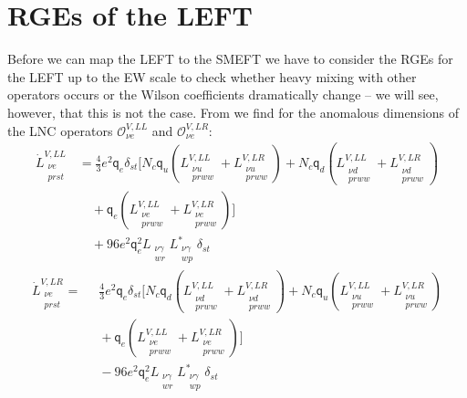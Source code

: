 \section{RGEs of the LEFT}\label{sec:RGELEFT}
Before we can map the LEFT to the SMEFT we have to consider the RGEs for the LEFT up to the EW scale to check whether heavy mixing with other operators occurs or the Wilson coefficients dramatically change -- we will see, however, that this is not the case. 
From \parencite[p.29]{jenkins2018lowAD} we find for the anomalous dimensions of the LNC operators $\mathcal{O}^{V,LL}_{\nu e}$ and $\mathcal{O}^{V,LR}_{\nu e}$:
\begin{align}
    \dot{L}^{V,LL}_{\substack{\nu e \\ prst}} &= \frac{4}{3} e^2 \mathsf{q}_e \delta_{st} \Bigg[ N_c \mathsf{q}_u \left( L^{V,LL}_{\substack{\nu u \\ prww}} + L^{V,LR}_{\substack{\nu u \\ prww}} \right) + N_c \mathsf{q}_d \left( L^{V,LL}_{\substack{\nu d \\ prww}} + L^{V,LR}_{\substack{\nu d \\ prww}} \right)\nonumber \\[5pt] 
    &\quad + \mathsf{q}_e \left( L^{V,LL}_{\substack{\nu e \\ prww}} + L^{V,LR}_{\substack{\nu e \\ prww}} \right) \Bigg]\nonumber \\[5pt] 
    &\quad + 96 e^2 \mathsf{q}_e^2 L_{\substack{\nu \gamma \\ wr}} L^*_{\substack{\nu \gamma \\ wp}} \delta_{st}
\end{align}
\begin{align} 
    \dot{L}^{V,LR}_{\substack{\nu e \\ prst}} =&\;\; \frac{4}{3} e^2 \mathsf{q}_e \delta_{st} \Bigg[ N_c \mathsf{q}_d \left( L^{V,LL}_{\substack{\nu d \\ prww}} + L^{V,LR}_{\substack{\nu d \\ prww}} \right) + N_c \mathsf{q}_u \left( L^{V,LL}_{\substack{\nu u \\ prww}} + L^{V,LR}_{\substack{\nu u \\ prww}} \right)\nonumber \\[5pt] 
    &\;\;+ \mathsf{q}_e \left( L^{V,LL}_{\substack{\nu e \\ prww}} + L^{V,LR}_{\substack{\nu e \\ prww}} \right) \Bigg]\nonumber \\[5pt] 
    &\;\;- 96 e^2 \mathsf{q}_e^2 L_{\substack{\nu \gamma \\ wr}} L^*_{\substack{\nu \gamma \\ wp}} \delta_{st}
\end{align}
